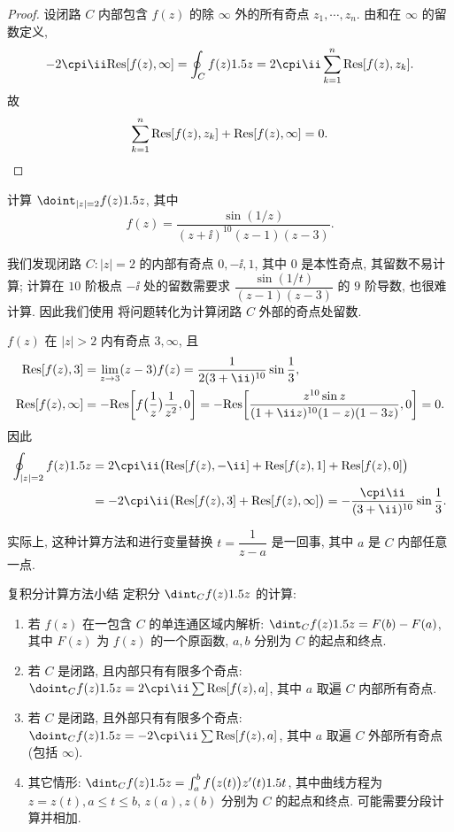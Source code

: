 \begin{proof}
  设闭路 $C$ 内部包含 $f(z)$ 的除 $\infty$ 外的所有奇点 $z_1,\cdots,z_n$.
  由\thmRes 和在 $\infty$ 的留数定义, 
  \[
     -2\cpi\ii\Res[f(z),\infty]
    =\oint_C f(z)\d z
    =2\cpi\ii\sum_{k=1}^n\Res[f(z),z_k].
  \]
  故
  \[
    \sum_{k=1}^n {\mathrm{Res}}[f(z),z_k]+{\mathrm{Res}}[f(z),\infty]=0.\qedhere
  \]
\end{proof}

\begin{example}
  计算 $\doint_{|z|=2}f(z)\d z$, 其中
  \[
    f(z)=\dfrac{\sin(1/z)}{(z+\ii)^{10}(z-1)(z-3)}.
  \]
\end{example}

我们发现闭路 $C:|z|=2$ 的内部有奇点 $0,-\ii,1$, 其中 $0$ 是本性奇点, 其留数不易计算; 计算在 $10$ 阶极点 $-\ii$ 处的留数需要求 $\dfrac{\sin(1/t)}{(z-1)(z-3)}$ 的 $9$ 阶导数, 也很难计算.
因此我们使用 将问题转化为计算闭路 $C$ 外部的奇点处留数.

\begin{solution}
  $f(z)$ 在 $|z|>2$ 内有奇点 $3,\infty$, 且
  \begin{align*}
     \Res[f(z),3]&
    =\lim_{z\ra3}(z-3)f(z)
    =\frac1{2(3+\ii)^{10}}\sin\frac13,\\
     \Res[f(z),\infty]&
    =-\Res\biggl[f\bigl(\frac1z\bigr)\frac1{z^2},0\biggr]
    =-\Res\biggl[\frac{z^{10}\sin z}{(1+\ii z)^{10}(1-z)(1-3z)},0\biggr]
    =0.
  \end{align*}
  因此
  \begin{align*}
     \oint_{|z|=2}f(z)\d z&
    =2\cpi\ii\bigl(\Res[f(z),-\ii]+\Res[f(z),1]+\Res[f(z),0]\bigr)\\&
    =-2\cpi\ii\bigl(\Res[f(z),3]+\Res[f(z),\infty]\bigr)
    =-\frac{\cpi\ii}{(3+\ii)^{10}}\sin\frac13.
  \end{align*}
\end{solution}

实际上, 这种计算方法和进行变量替换 $t=\dfrac1{z-a}$ 是一回事, 其中 $a$ 是 $C$ 内部任意一点.

\begin{fifth}{复积分计算方法小结}
  定积分 $\dint_Cf(z)\d z$ 的计算:
  \begin{enumerate}
    \item 若 $f(z)$ 在一包含 $C$ 的单连通区域内解析: 
    $\dint_C f(z)\d z=F(b)-F(a)$, 
    其中 $F(z)$ 为 $f(z)$ 的一个原函数, $a,b$ 分别为 $C$ 的起点和终点.
    \item 若 $C$ 是闭路, 且内部只有有限多个奇点: 
    $\doint_C f(z)\d z=2\cpi\ii\sum \Res[f(z),a]$, 
    其中 $a$ 取遍 $C$ 内部所有奇点.
    \item 若 $C$ 是闭路, 且外部只有有限多个奇点: 
    $\doint_C f(z)\d z=-2\cpi\ii\sum \Res[f(z),a]$, 
    其中 $a$ 取遍 $C$ 外部所有奇点(包括 $\infty$).
    \item 其它情形: 
    $\dint_Cf(z)\d z=\int_a^b f\bigl(z(t)\bigr)z'(t)\d t$, 
    其中曲线方程为 $z=z(t),a\le t\le b$, $z(a),z(b)$ 分别为 $C$ 的起点和终点. 可能需要分段计算并相加.
  \end{enumerate}
\end{fifth}

